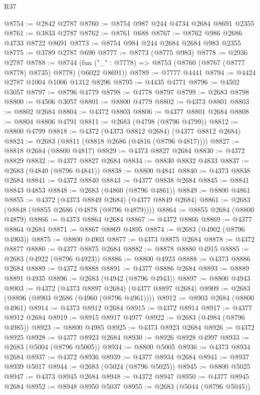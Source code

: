 \begin{lexlean}{R37}
\begin{coremodule}
@8754 := @2842 @2787
@8760 := @8754 @987 @244 @4734 @2684 @8691 @2355
@8761 := @3833 @2787
@8762 := @8761 @688
@8767 := @8762 @986 @2686 @4733 @8722 @8691
@8773 := @8754 @984 @244 @2684 @2684 @983 @2355
@8775 := @3789 @2787 @690
@8777 := @8773 (@8775 @983)
@8778 := @2936 @2787
@8788 := @8744 (fun ("_" : @7778) => @8753 (@8760 (@8767 (@8777 @8778) @8735) @8778) (@6022 @8691))
@8789 := @7777 @4441
@8794 := @4424 @2787 @1004 @1006 @1312 @8296
@8795 := @4435 @4771
@8796 := @4502 @3057
@8797 := @8796 @4779
@8798 := @4778 @8797
@8799 := @2683 @8798
@8800 := @4506 @3057
@8801 := @8800 @4779
@8802 := @4373 @8801
@8803 := @8802 @2684
@8804 := @4372 @8803
@8806 := @4377 @8801 @2684
@8808 := @8804 @8806 @4791
@8811 := @2683 (@4798 (@8796 @4799))
@8812 := @8800 @4799
@8818 := @4372 (@4373 @8812 @2684) (@4377 @8812 @2684)
@8824 := @2683 (@8811 (@8818 @2686 (@4816 (@8796 @4817))))
@8827 := @8818 @2684 (@8800 @4817)
@8829 := @4373 @8827 @2684
@8830 := @4372 @8829
@8832 := @4377 @8827 @2684
@8834 := @8830 @8832 @4833
@8837 := @2683 (@4840 (@8796 @4841))
@8838 := @8800 @4841
@8840 := @4373 @8838 @2684
@8841 := @4372 @8840
@8843 := @4377 @8838 @2684
@8845 := @8841 @8843 @4853
@8848 := @2683 (@4860 (@8796 @4861))
@8849 := @8800 @4861
@8855 := @4372 (@4373 @8849 @2684) (@4377 @8849 @2684)
@8861 := @2683 (@8848 (@8855 @2686 (@4878 (@8796 @4879))))
@8864 := @8855 @2684 (@8800 @4879)
@8866 := @4373 @8864 @2684
@8867 := @4372 @8866
@8869 := @4377 @8864 @2684
@8871 := @8867 @8869 @4895
@8874 := @2683 (@4902 (@8796 @4903))
@8875 := @8800 @4903
@8877 := @4373 @8875 @2684
@8878 := @4372 @8877
@8880 := @4377 @8875 @2684
@8882 := @8878 @8880 @4915
@8885 := @2683 (@4922 (@8796 @4923))
@8886 := @8800 @4923
@8888 := @4373 @8886 @2684
@8889 := @4372 @8888
@8891 := @4377 @8886 @2684
@8893 := @8889 @8891 @4935
@8896 := @2683 (@4942 (@8796 @4943))
@8897 := @8800 @4943
@8903 := @4372 (@4373 @8897 @2684) (@4377 @8897 @2684)
@8909 := @2683 (@8896 (@8903 @2686 (@4960 (@8796 @4961))))
@8912 := @8903 @2684 (@8800 @4961)
@8914 := @4373 @8912 @2684
@8915 := @4372 @8914
@8917 := @4377 @8912 @2684
@8919 := @8915 @8917 @4977
@8922 := @2683 (@4984 (@8796 @4985))
@8923 := @8800 @4985
@8925 := @4373 @8923 @2684
@8926 := @4372 @8925
@8928 := @4377 @8923 @2684
@8930 := @8926 @8928 @4997
@8933 := @2683 (@5004 (@8796 @5005))
@8934 := @8800 @5005
@8936 := @4373 @8934 @2684
@8937 := @4372 @8936
@8939 := @4377 @8934 @2684
@8941 := @8937 @8939 @5017
@8944 := @2683 (@5024 (@8796 @5025))
@8945 := @8800 @5025
@8947 := @4373 @8945 @2684
@8948 := @4372 @8947
@8950 := @4377 @8945 @2684
@8952 := @8948 @8950 @5037
@8955 := @2683 (@5044 (@8796 @5045))

\end{coremodule}
\end{lexlean}
